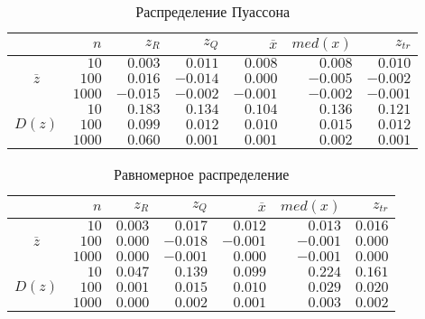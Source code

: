 \documentclass[report1.tex]{subfiles}
\begin{document}
\begin{table}[H]\label{table:poisson}
\centering
\caption{Распределение Пуассона}
\begin{tabular}{c*6r}
\toprule
{} &         
$n$ & 
\centering $z_R$ & 
\centering $z_Q$ &
\centering $\overline{x}$& 
\centering $med(x)$ &
\centering $z_{tr}$ \tabularnewline
\midrule
\multirow{3}{*}{$\overline{z}$}
& $10$    & $ 0.003$  & $ 0.011$  & $ 0.008$  & $ 0.008$  & $ 0.010$ \\
& $100$   & $ 0.016$  & $-0.014$  & $ 0.000$  & $-0.005$  & $-0.002$ \\
& $1000$  & $-0.015$  & $-0.002$  & $-0.001$  & $-0.002$  & $-0.001$ \\
\midrule
\multirow{3}{*}{$D(z)$}
& $10$    & $0.183$  & $0.134$  & $0.104$  & $0.136$  & $0.121$ \\
& $100$   & $0.099$  & $0.012$  & $0.010$  & $0.015$  & $0.012$ \\
& $1000$  & $0.060$  & $0.001$  & $0.001$  & $0.002$  & $0.001$ \\
\bottomrule
\end{tabular}
\end{table}

\begin{table}[H]\label{table:uniform}
\centering
\caption{Равномерное распределение}
\begin{tabular}{c*6r}
\toprule
{} &         
$n$ & 
\centering $z_R$ & 
\centering $z_Q$ &
\centering $\overline{x}$& 
\centering $med(x)$ &
\centering $z_{tr}$ \tabularnewline
\midrule
\multirow{3}{*}{$\overline{z}$}
& $10$    & $ 0.003$  & $ 0.017$  & $ 0.012$  & $ 0.013$  & $ 0.016$ \\
& $100$   & $ 0.000$  & $-0.018$  & $-0.001$  & $-0.001$  & $ 0.000$ \\
& $1000$  & $ 0.000$  & $-0.001$  & $ 0.000$  & $-0.001$  & $ 0.000$ \\
\midrule
\multirow{3}{*}{$D(z)$}
& $10$    & $0.047$  & $0.139$  & $0.099$  & $0.224$  & $0.161$ \\
& $100$   & $0.001$  & $0.015$  & $0.010$  & $0.029$  & $0.020$ \\
& $1000$  & $0.000$  & $0.002$  & $0.001$  & $0.003$  & $0.002$ \\
\bottomrule
\end{tabular}
\end{table}


\newpage
\end{document}
